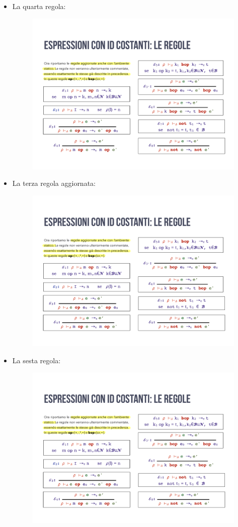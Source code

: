 \documentclass[a4paper]{article}
\begin{document}
\begin{itemize}
		\item La quarta regola:
		\begin{figure}[!htp]
			\centering
			\includegraphics[width=.6\textwidth]{img/regola_espressione-mod-4.pdf}
		\end{figure}
		
		\item La terza regola aggiornata:
		\begin{figure}[!htp]
			\centering
			\includegraphics[width=.6\textwidth]{img/regola_espressione-mod-5.pdf}
		\end{figure}
		
		\item La sesta regola:
		\begin{figure}[!htp]
			\centering
			\includegraphics[width=.6\textwidth]{img/regola_espressione-mod-6.pdf}
		\end{figure}
		

\end{itemize}
\end{document}
